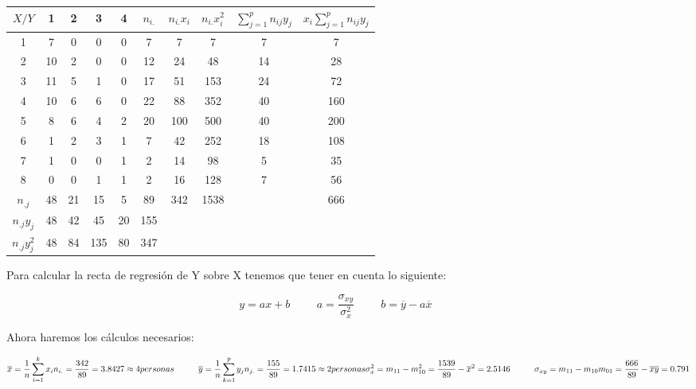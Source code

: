 \begin{table}[ht]
    \begin{tabular}{|c|c|c|c|c|c|c|c|c|c|}
        \hline
         $X/Y$ & 1 & 2 & 3 & 4 & $n_{i.}$ & $n_{i.} x_i$ & $n_{i.} x_i^2$ & $\sum_{j=1}^p n_{ij} y_j$ & $x_i \sum_{j=1}^p n_{ij} y_j$ \\ \hline
         1 & 7 & 0 & 0 & 0 & 7 & 7 & 7 & 7 & 7 \\ \hline 
         2 & 10 & 2 & 0 & 0 & 12 & 24 & 48 & 14 & 28 \\ \hline 
         3 & 11 & 5 & 1 & 0 & 17 & 51 & 153 & 24 & 72 \\ \hline 
         4 & 10 & 6 & 6 & 0 & 22 & 88 & 352 & 40 & 160 \\ \hline 
         5 & 8 & 6 & 4 & 2 & 20 & 100 & 500 & 40 & 200 \\ \hline 
         6 & 1 & 2 & 3 & 1 & 7 & 42 & 252 & 18 & 108 \\ \hline 
         7 & 1 & 0 & 0 & 1 & 2 & 14 & 98 & 5 & 35 \\ \hline
         8 & 0 & 0 & 1 & 1 & 2 & 16 & 128 & 7 & 56 \\ \hline
         $n_{.j}$ & 48 & 21 & 15 & 5 & 89 & 342 & 1538 &  & 666 \\ \hline
         $n_{.j}y_j$ & 48 & 42 & 45 & 20 & 155 &  &  &  &  \\ \hline
         $n_{.j}y_j^2$ & 48 & 84 & 135 & 80 & 347 &  &  &  &  \\ \hline
    \end{tabular}
\end{table}

Para calcular la recta de regresión de Y sobre X tenemos que tener en cuenta lo siguiente:

\begin{equation*}
    y = ax+b
    \hspace{1cm}
    a = \dfrac{\sigma_{xy}}{\sigma_x^2}
    \hspace{1cm}
    b = \overline{y} - a \overline{x}
    \hspace{1cm}
\end{equation*}

Ahora haremos los cálculos necesarios:

\begin{center}
    \begin{equation*}
        \overline{x} = \dfrac{1}{n} \sum_{i=1}^k x_i n_{i.} = \dfrac{342}{89} = 3.8427 \approx 4 personas
        \hspace{1cm}
        \overline{y} = \dfrac{1}{n} \sum_{k=1}^p y_j n_{j.} = \dfrac{155}{89} = 1.7415 \approx 2 personas\\
        
        \sigma_{x}^2 = m_{11} - m_{10}^2 = \dfrac{1539}{89} - \overline{x}^2 = 2.5146
        \hspace{1cm}
        \sigma_{xy} = m_{11} - m_{10}m_{01} = \dfrac{666}{89} - \overline{x}\overline{y} = 0.791
    \end{equation*}
\end{center}

